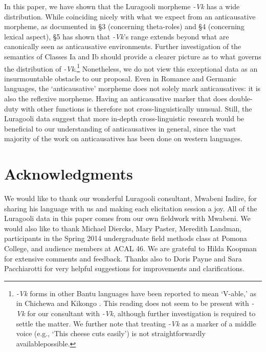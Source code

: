 \documentclass[output=paper]{langsci/langscibook}
\begin{document}
\begin{styleTabellenberschrift}
\begin{styleTabellenberschrift}
In this paper, we have shown that the Luragooli morpheme \textit{{}-Vk} has a wide distribution. While coinciding nicely with what we expect from an anticausative morpheme, as documented in §3 (concerning theta-roles) and §4 (concerning lexical aspect), §5 has shown that \textit{{}-Vk}’s range extends beyond what are canonically seen as anticausative environments. Further investigation of the semantics of Classes Ia and Ib should provide a clearer picture as to what governs the distribution of \textit{{}-Vk}.\footnote{ \textit{{}-Vk} forms in other Bantu languages have been reported to mean ‘V-able,’  as in Chichewa \citep{Simango2009} and Kikongo \citep{Fernando2013}. This reading does not seem to be present with \textit{{}-}\textit{Vk} for our consultant with \textit{{}-Vk}, although further investigation is required to settle the matter. We further note that treating \textit{{}-Vk} as a marker of a middle voice (e.g., ‘This cheese cuts easily’) is not straightforwardly availablepossible.} Nonetheless, we do not view this exceptional data as an insurmountable obstacle to our proposal. Even in Romance and Germanic languages, the ‘anticausative’ morpheme does not solely mark anticausatives: it is also the reflexive morpheme. Having an anticausative marker that does double-duty with other functions is therefore not cross-linguistically unusual. Still, the Luragooli data suggest that more in-depth cross-linguistic research would be beneficial to our understanding of anticausatives in general, since the vast majority of the work on anticausatives has been done on western languages.%
%

\chapter[Acknowledgments]{Acknowledgments}

We would like to thank our wonderful Luragooli consultant, Mwabeni Indire, for sharing his language with us and making each elicitation session a joy. All of the Luragooli data in this paper comes from our own fieldwork with Mwabeni. We would also like to thank Michael Diercks, Mary Paster, Meredith Landman, participants in the Spring 2014 undergraduate field methods class at Pomona College, and audience members at ACAL 46. We are grateful to Hilda Koopman for extensive comments and feedback. Thanks also to Doris Payne and Sara Pacchiarotti for very helpful suggestions for improvements and clarifications.


\end{styleTabellenberschrift}
\end{styleTabellenberschrift}
\end{document}
